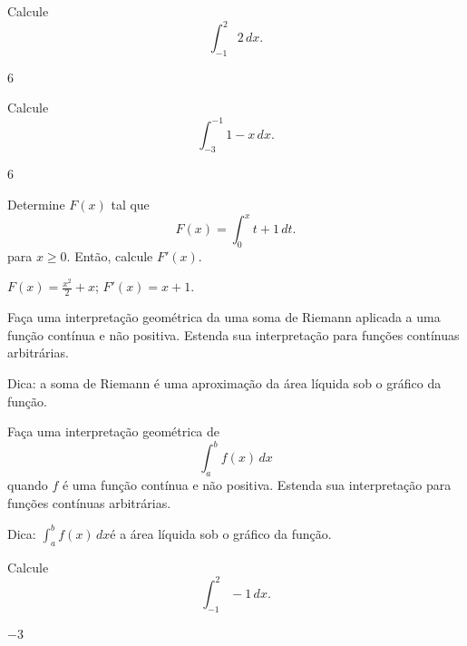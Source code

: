 \begin{exer}
  Calcule
  \begin{equation}
    \int_{-1}^2 2\,dx.
  \end{equation}
\end{exer}
\begin{resp}
  $6$
\end{resp}

\begin{exer}
  Calcule
  \begin{equation}
    \int_{-3}^{-1} 1-x\,dx.
  \end{equation}
\end{exer}
\begin{resp}
  $6$
\end{resp}

\begin{exer}
  Determine $F(x)$ tal que
  \begin{equation}
    F(x) = \int_{0}^{x} t+1\,dt.
  \end{equation}
  para $x\geq 0$. Então, calcule $F'(x)$.
\end{exer}
\begin{resp}
  $\displaystyle F(x) = \frac{x^2}{2} + x$; $F'(x) = x + 1$.
\end{resp}

\begin{exer}\label{exer:int_geoRiemann}
  Faça uma interpretação geométrica da uma soma de Riemann aplicada a uma função contínua e não positiva. Estenda sua interpretação para funções contínuas arbitrárias.
\end{exer}
\begin{resp}
  Dica: a soma de Riemann é uma aproximação da área líquida sob o gráfico da função.
\end{resp}

\begin{exer}\label{exer:int_geointdef}
  Faça uma interpretação geométrica de
  \begin{equation}
    \int_a^b f(x)\,dx
  \end{equation}
  quando $f$ é uma função contínua e não positiva. Estenda sua interpretação para funções contínuas arbitrárias.
\end{exer}
\begin{resp}
  Dica: $\displaystyle \int_a^b f(x)\,dx$é a área líquida sob o gráfico da função.
\end{resp}

\begin{exer}
  Calcule
  \begin{equation}
    \int_{-1}^2 -1\,dx.
  \end{equation}
\end{exer}
\begin{resp}
  $-3$
\end{resp}

